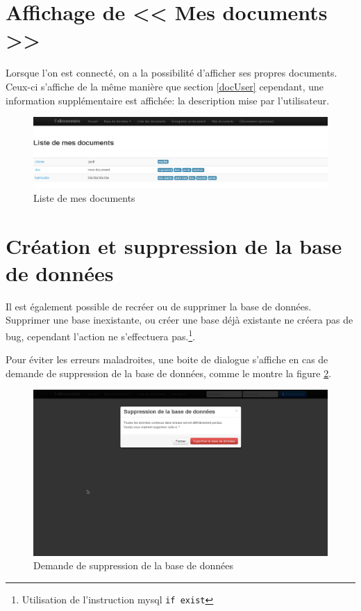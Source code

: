 \documentclass[12pt,a4paper,openany]{book}
\let\pagebreakORIG\pagebreak
\let\clearpageORIG\clearpage
\let\cleardoublepageORIG\cleardoublepage
\newcommand{\removepagebreak}{\renewcommand{\pagebreak}{}\renewcommand{\clearpage}{}\renewcommand{\cleardoublepage}{}}
\newcommand{\restorepagebreak}{\renewcommand{\pagebreak}{\pagebreakORIG}\renewcommand{\clearpage}{\clearpageORIG}\renewcommand{\cleardoublepage}{\cleardoublepageORIG}}
\begin{document}
	\section{Affichage de << Mes documents >>}
		Lorsque l'on est connecté, on a la possibilité d'afficher ses propres documents. Ceux-ci s'affiche de la même manière que
		section \ref{docUser} cependant, une information supplémentaire est affichée: la description mise par l'utilisateur. 
	\begin{figure}[H]
		\centering
		\includegraphics[width=18cm]{screens/mesDocs.png} 
		\caption{Liste de mes documents} 
		\label{fig:index}
	\end{figure}
	\section{Création et suppression de la base de données}
	Il est également possible de recréer ou de supprimer la base de données. Supprimer une base inexistante, ou créer une base déjà
	existante ne créera pas de bug, cependant l'action ne s'effectuera pas.\footnote{Utilisation de l'instruction mysql \texttt{if
	exist}}.

	Pour éviter les erreurs maladroites, une boite de dialogue s'affiche en cas de demande de suppression de la base de données,
	comme le montre la figure \ref{fig:suppression}.
	\begin{figure}[H]
		\centering
		\includegraphics[width=18cm]{screens/suppression.png} 
		\caption{Demande de suppression de la base de données} 
		\label{fig:suppression}
	\end{figure}
	\appendix
	\listoffigures
	\removepagebreak
	\vfill
	\lstlistoflistings
	\vfill
	\restorepagebreak
\end{document}
